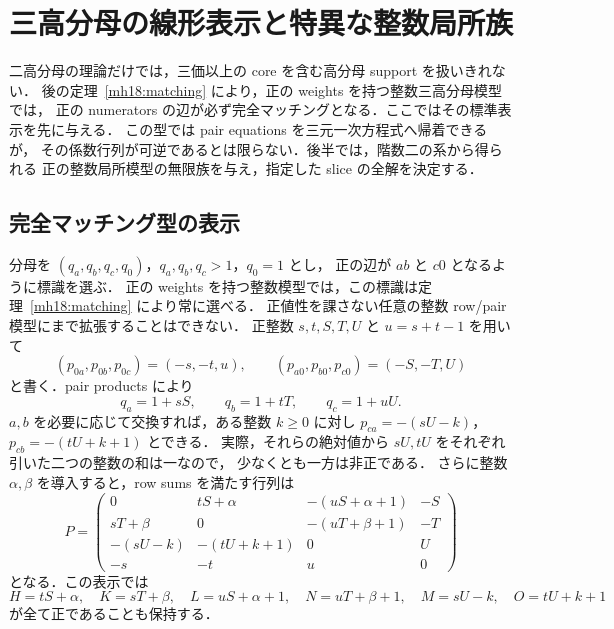 \section{三高分母の線形表示と特異な整数局所族}
\label{sh14:section}

二高分母の理論だけでは，三価以上の core を含む高分母 support を扱いきれない．
後の定理~\ref{mh18:matching} により，正の weights を持つ整数三高分母模型では，
正の numerators の辺が必ず完全マッチングとなる．ここではその標準表示を先に与える．
この型では pair equations を三元一次方程式へ帰着できるが，
その係数行列が可逆であるとは限らない．後半では，階数二の系から得られる
正の整数局所模型の無限族を与え，指定した slice の全解を決定する．

\subsection{完全マッチング型の表示}
\label{sh14:matching-setup}

分母を $(q_a,q_b,q_c,q_0)$，$q_a,q_b,q_c>1$，$q_0=1$ とし，
正の辺が $ab$ と $c0$ となるように標識を選ぶ．
正の weights を持つ整数模型では，この標識は定理~\ref{mh18:matching} により常に選べる．
正値性を課さない任意の整数 row/pair 模型にまで拡張することはできない．
正整数 $s,t,S,T,U$ と $u=s+t-1$ を用いて
\[
 (p_{0a},p_{0b},p_{0c})=(-s,-t,u),\qquad
 (p_{a0},p_{b0},p_{c0})=(-S,-T,U)
\]
と書く．pair products により
\[
 q_a=1+sS,\qquad q_b=1+tT,\qquad q_c=1+uU.
\]
$a,b$ を必要に応じて交換すれば，ある整数 $k\geq0$ に対し
$p_{ca}=-(sU-k)$，$p_{cb}=-(tU+k+1)$ とできる．
実際，それらの絶対値から $sU,tU$ をそれぞれ引いた二つの整数の和は一なので，
少なくとも一方は非正である．
さらに整数 $\alpha,\beta$ を導入すると，row sums を満たす行列は
\begin{equation}\label{sh14:matching-P}
 P=\begin{pmatrix}
 0&tS+\alpha&-(uS+\alpha+1)&-S\\
 sT+\beta&0&-(uT+\beta+1)&-T\\
 -(sU-k)&-(tU+k+1)&0&U\\
 -s&-t&u&0
 \end{pmatrix}
\end{equation}
となる．この表示では
\[
 H=tS+\alpha,\quad K=sT+\beta,\quad
 L=uS+\alpha+1,\quad N=uT+\beta+1,\quad
 M=sU-k,\quad O=tU+k+1
\]
が全て正であることも保持する．


